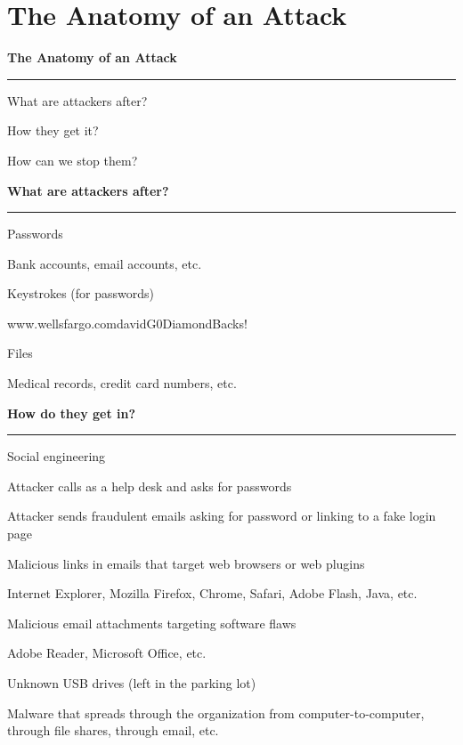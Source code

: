 \section{The Anatomy of an Attack}
\begin{mdframed}
\textbf{The Anatomy of an Attack}
\hrule
\begin{description}
\item What are attackers after?
\item How they get it?
\item How can we stop them?
\end{description}
\end{mdframed}
\begin{mdframed}
\textbf{What are attackers after?}
\hrule
\begin{description}
\item Passwords
\begin{description}
\item Bank accounts, email accounts, etc.
\end{description}
\item Keystrokes (for passwords)
\begin{description}
\item www.wellsfargo.comdavidG0DiamondBacks!
\end{description}
\item Files
\begin{description}
\item Medical records, credit card numbers, etc.
\end{description}
\end{description}
\end{mdframed}
\newpage
\begin{mdframed}
\textbf{How do they get in?}
\hrule
\begin{description}
\item Social engineering
\begin{description}
\item Attacker calls as a help desk and asks for passwords
\item Attacker sends fraudulent emails asking for password or linking to a fake login page
\end{description}
\item Malicious links in emails that target web browsers or web plugins
\begin{description}
\item Internet Explorer, Mozilla Firefox, Chrome, Safari, Adobe Flash, Java, etc.
\end{description}
\item Malicious email attachments targeting software flaws
\begin{description}
\item Adobe Reader, Microsoft Office, etc.
\end{description}
\item Unknown USB drives (left in the parking lot)
\item Malware that spreads through the organization from computer-to-computer, through file shares, through email, etc.
\end{description}
\end{mdframed}
